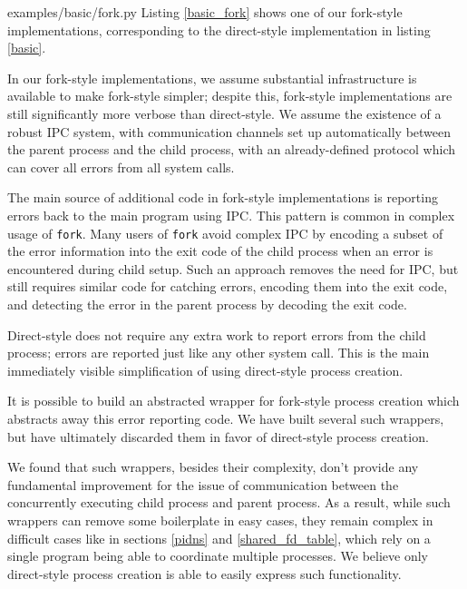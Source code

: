 \documentclass[letterpaper,twocolumn,10pt]{article}
\begin{document}

{examples/basic/fork.py}
Listing \ref{basic_fork} shows one of our fork-style implementations,
corresponding to the direct-style implementation in listing \ref{basic}.

In our fork-style implementations,
we assume substantial infrastructure is available to make fork-style simpler;
despite this, fork-style implementations are still significantly more verbose than direct-style.
We assume the existence of a robust IPC system,
with communication channels set up automatically between the parent process and the child process,
with an already-defined protocol which can cover all errors from all system calls.

The main source of additional code in fork-style implementations
is reporting errors back to the main program using IPC.
This pattern is common in complex usage of \texttt{fork}.\cite{posix_spawn_error_pipe}\cite{python_subprocess_errpipe}
Many users of \texttt{fork} avoid complex IPC
by encoding a subset of the error information into the exit code of the child process
when an error is encountered during child setup.
Such an approach removes the need for IPC,
but still requires similar code for catching errors, encoding them into the exit code,
and detecting the error in the parent process by decoding the exit code.

Direct-style does not require any extra work to report errors from the child process;
errors are reported just like any other system call.
This is the main immediately visible simplification of using direct-style process creation.

It is possible to build an abstracted wrapper for fork-style process creation
which abstracts away this error reporting code.
We have built several such wrappers,
but have ultimately discarded them in favor of direct-style process creation.\cite{sfork}

We found that such wrappers, besides their complexity,
don't provide any fundamental improvement
for the issue of communication between the concurrently executing child process and parent process.
As a result, while such wrappers can remove some boilerplate in easy cases,
they remain complex in difficult cases like in sections \ref{pidns} and \ref{shared_fd_table},
which rely on a single program being able to coordinate multiple processes.
We believe only direct-style process creation is able to easily express such functionality.
\end{document}
